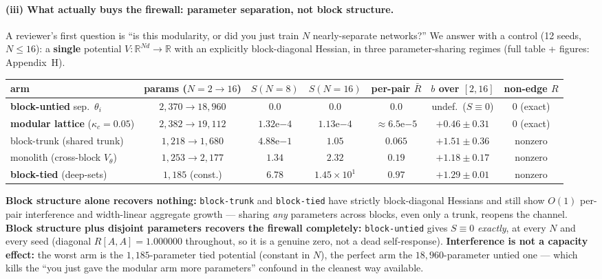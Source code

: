 \documentclass[11pt]{article}
\newcommand{\R}{\mathbb{R}}
\begin{document}
\paragraph{(iii) What actually buys the firewall: parameter separation, not block structure.} A reviewer's first question is ``is this modularity, or did you just train $N$ nearly-separate networks?'' We answer with a control (12 seeds, $N\le16$): a \textbf{single} potential $V:\R^{Nd}\to\R$ with an explicitly block-diagonal Hessian, in three parameter-sharing regimes (full table + figures: Appendix~H).

\begin{center}\footnotesize\setlength{\tabcolsep}{3pt}
\begin{tabular}{lcccccc}
\toprule
arm & params ($N{=}2{\to}16$) & $S(N{=}8)$ & $S(N{=}16)$ & per-pair $\bar R$ & $b$ over $[2,16]$ & non-edge $R$ \\
\midrule
\textbf{block-untied} sep.\ $\theta_i$ & $2{,}370\to18{,}960$ & $\mathbf{0.0}$ & $\mathbf{0.0}$ & $\mathbf{0.0}$ & undef.\ ($S\equiv0$) & $0$ (exact) \\
\textbf{modular lattice} ($\kappa_c{=}0.05$) & $2{,}382\to19{,}112$ & $1.32\mathrm{e}{-4}$ & $1.13\mathrm{e}{-4}$ & ${\approx}6.5\mathrm{e}{-5}$ & $+0.46\pm0.31$ & $0$ (exact) \\
block-trunk (shared trunk) & $1{,}218\to1{,}680$ & $4.88\mathrm{e}{-1}$ & $1.05$ & $0.065$ & $+1.51\pm0.36$ & nonzero \\
monolith (cross-block $V_\theta$) & $1{,}253\to2{,}177$ & $1.34$ & $2.32$ & $0.19$ & $+1.18\pm0.17$ & nonzero \\
\textbf{block-tied} (deep-sets) & $1{,}185$ (const.) & $6.78$ & $1.45\times10^{1}$ & $\mathbf{0.97}$ & $+1.29\pm0.01$ & nonzero \\
\bottomrule
\end{tabular}
\end{center}

\textbf{Block structure alone recovers nothing:} \texttt{block-trunk} and \texttt{block-tied} have strictly block-diagonal Hessians and still show $O(1)$ per-pair interference and width-linear aggregate growth --- sharing \emph{any} parameters across blocks, even only a trunk, reopens the channel. \textbf{Block structure plus disjoint parameters recovers the firewall completely:} \texttt{block-untied} gives $S\equiv0$ \emph{exactly}, at every $N$ and every seed (diagonal $R[A,A]=1.000000$ throughout, so it is a genuine zero, not a dead self-response). \textbf{Interference is not a capacity effect:} the worst arm is the $1{,}185$-parameter tied potential (constant in $N$), the perfect arm the $18{,}960$-parameter untied one --- which kills the ``you just gave the modular arm more parameters'' confound in the cleanest way available.
\end{document}
